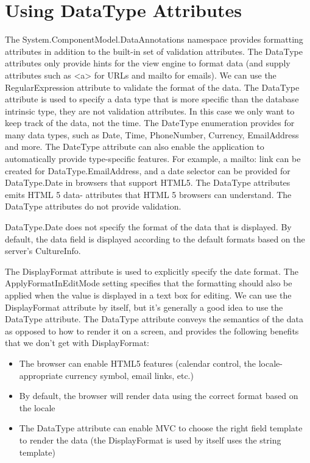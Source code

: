 \documentclass{report}
\begin{document}
    \section{Using DataType Attributes}
    The System.ComponentModel.DataAnnotations namespace provides formatting attributes in addition
    to the built-in set of validation attributes. The DataType attributes only provide hints for the
    view engine to format data (and supply attributes such as <a> for URLs and mailto for emails).
    We can use the RegularExpression attribute to validate the format of the data. The DataType
    attribute is used to specify a data type that is more specific than the database intrinsic
    type, they are not validation attributes. In this case we only want to keep track
    of the data, not the time. The DateType enumeration provides for many data types, such as Date,
    Time, PhoneNumber, Currency, EmailAddress and more. The DateType attribute can also enable the
    application to automatically provide type-specific features. For example, a mailto: link can be
    created for DataType.EmailAddress, and a date selector can be provided for DataType.Date in
    browsers that support HTML5. The DataType attributes emits HTML 5 data- attributes that HTML 5
    browsers can understand. The DataType attributes do not provide validation.

    DataType.Date does not specify the format of the data that is displayed. By default, the data
    field is displayed according to the default formats based on the server's CultureInfo.

    The DisplayFormat attribute is used to explicitly specify the date format.
    The ApplyFormatInEditMode setting specifies that the formatting should also be applied when the
    value is displayed in a text box for editing.
    We can use the DisplayFormat attribute by itself, but it's generally a good idea to use the
    DataType attribute. The DataType attribute conveys the semantics of the data as opposed
    to how to render it on a screen, and provides the following benefits that we don't get with
    DisplayFormat:
    \begin{itemize}
        \item The browser can enable HTML5 features (calendar control, the locale-appropriate
        currency symbol, email links, etc.)
        \item By default, the browser will render data using the correct format based on the
        locale
        \item The DataType attribute can enable MVC to choose the right field template to render
        the data (the DisplayFormat is used by itself uses the string template)
    \end{itemize}
\end{document}
